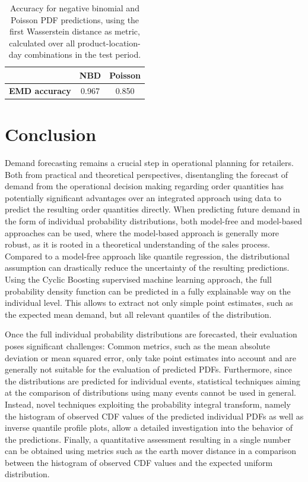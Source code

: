 \documentclass[BCOR=1mm, DIV=calc,10pt,
twoside=true,
twocolumn,
headings=normal]{scrartcl}
\begin{document}
\begin{table}[h!]
\begin{center}
\caption{Accuracy for negative binomial and Poisson PDF predictions, using the first Wasserstein distance as metric, calculated over all product-location-day combinations in the test period.}
\label{tab:cdf_acc}
\begin{tabular}{c|c|c}
 & \textbf{NBD} & \textbf{Poisson} \\
\hline
\textbf{EMD accuracy} & 0.967 & 0.850
\end{tabular}
\end{center}
\end{table}


\section{Conclusion}
Demand forecasting remains a crucial step in operational planning for retailers. Both from practical and theoretical perspectives, disentangling the forecast of demand from the operational decision making regarding order quantities has potentially significant advantages over an integrated approach using data to predict the resulting order quantities directly. When predicting future demand in the form of individual probability distributions, both model-free and model-based approaches can be used, where the model-based approach is generally more robust, as it is rooted in a theoretical understanding of the sales process. Compared to a model-free approach like quantile regression, the distributional assumption can drastically reduce the uncertainty of the resulting predictions. Using the Cyclic Boosting supervised machine learning approach, the full probability density function can be predicted in a fully explainable way on the individual level. This allows to extract not only simple point estimates, such as the expected mean demand, but all relevant quantiles of the distribution.

Once the full individual probability distributions are forecasted, their evaluation poses significant challenges: Common metrics, such as the mean absolute deviation or mean squared error, only take point estimates into account and are generally not suitable for the evaluation of predicted PDFs. Furthermore, since the distributions are predicted for individual events, statistical techniques aiming at the comparison of distributions using many events cannot be used in general. Instead, novel techniques exploiting the probability integral transform, namely the histogram of observed CDF values of the predicted individual PDFs as well as inverse quantile profile plots, allow a detailed investigation into the behavior of the predictions. Finally, a quantitative assessment resulting in a single number can be obtained using metrics such as the earth mover distance in a comparison between the histogram of observed CDF values and the expected uniform distribution.
\end{document}
